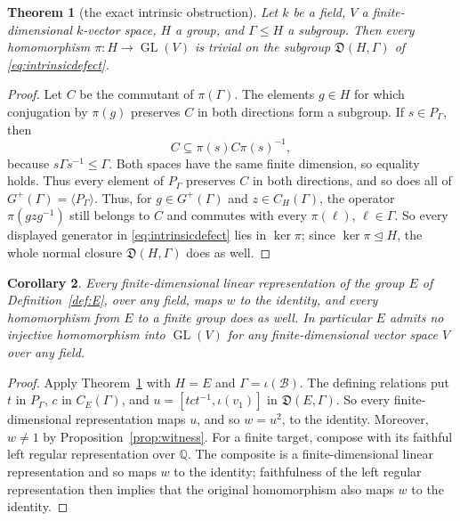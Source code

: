 \documentclass[11pt]{amsart}
\newcommand{\leanverified}[2]{\ignorespaces}
\newtheorem{theorem}{Theorem}[section]
\newtheorem{corollary}[theorem]{Corollary}
\theoremstyle{definition}
\theoremstyle{remark}
\theoremstyle{plain}
\newcommand{\GL}{\operatorname{GL}}
\begin{document}
\begin{theorem}[the exact intrinsic obstruction]\label{thm:exactfd-intrinsic}
Let $k$ be a field, $V$ a finite-dimensional $k$-vector space, $H$ a
group, and $\Gamma\le H$ a subgroup.  Then every homomorphism
$\pi\colon H\to\GL(V)$ is trivial on the subgroup
$\mathfrak D(H,\Gamma)$ of \eqref{eq:intrinsicdefect}.
\leanverified{Sofic/ManuscriptExactWrappers}{GroupApproximation.ManuscriptExactWrappers.manuscriptTheoremB}
\end{theorem}

\begin{proof}
Let $C$ be the commutant of $\pi(\Gamma)$.  The elements $g\in H$ for
which conjugation by $\pi(g)$ preserves $C$ in both directions form a
subgroup.  If $s\in P_\Gamma$, then
\[
 C\subseteq \pi(s)C\pi(s)^{-1},
\]
because $s\Gamma s^{-1}\leq\Gamma$.  Both spaces have the same finite
dimension, so equality holds.  Thus every element of $P_\Gamma$ preserves
$C$ in both directions, and so does all of
$G^{+}(\Gamma)=\langle P_\Gamma\rangle$.  Thus, for $g\in
G^{+}(\Gamma)$ and $z\in C_H(\Gamma)$, the operator
$\pi(gzg^{-1})$ still belongs to $C$ and commutes with every
$\pi(\ell)$, $\ell\in\Gamma$.  So every displayed generator in
\eqref{eq:intrinsicdefect} lies in $\ker\pi$; since
$\ker\pi\trianglelefteq H$, the whole normal closure
$\mathfrak D(H,\Gamma)$ does as well.
\end{proof}

\begin{corollary}\label{cor:notRFD}
Every finite-dimensional linear representation of the group $E$ of
Definition~\ref{def:E}, over any field, maps $w$ to the identity, and
every homomorphism from $E$ to a finite group does as well.  In
particular $E$ admits no injective homomorphism into $\GL(V)$ for any
finite-dimensional vector space $V$ over any field.
\leanverified{Sofic/LiteralFiniteDimensionalObstruction}{GroupApproximation.LiteralFiniteDimensionalObstruction.manuscriptFiniteDimensionalConsequences}
\end{corollary}

\begin{proof}
Apply Theorem~\ref{thm:exactfd-intrinsic} with $H=E$ and
$\Gamma=\iota(\mathcal B)$.  The defining relations put
$t$ in $P_\Gamma$, $c$ in $C_E(\Gamma)$, and
$u=[tct^{-1},\iota(v_1)]$ in $\mathfrak D(E,\Gamma)$.  So every
finite-dimensional representation maps $u$, and so $w=u^2$, to the
identity.  Moreover,
$w\neq1$ by Proposition~\ref{prop:witness}.  For a finite target,
compose with its faithful left regular representation over
$\mathbb Q$.  The composite is a finite-dimensional linear
representation and so maps $w$ to the identity; faithfulness of the
left regular representation then implies that the original
homomorphism also maps $w$ to the identity.
\end{proof}
\end{document}
